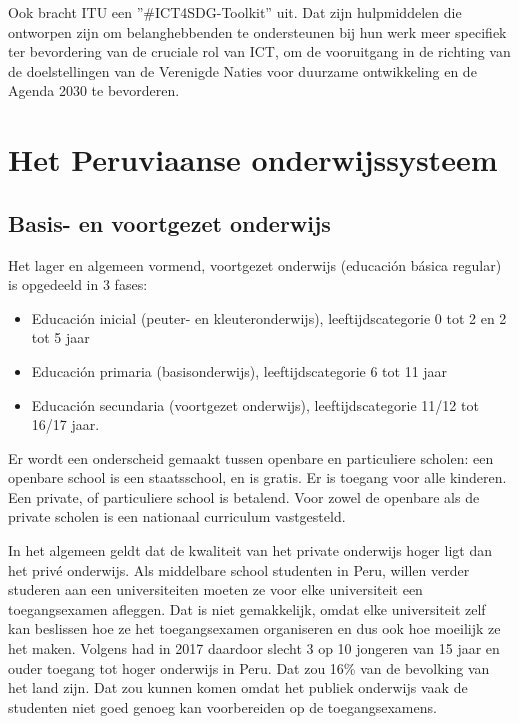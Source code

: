 
Ook bracht ITU een ''\#ICT4SDG-Toolkit'' uit. Dat zijn hulpmiddelen die ontworpen zijn om belanghebbenden te ondersteunen bij hun werk meer specifiek ter bevordering van de cruciale rol van ICT, om de vooruitgang in de richting van de doelstellingen van de Verenigde Naties voor duurzame ontwikkeling en de Agenda 2030 te bevorderen. \autocite{ITU2015}
 
\section{Het Peruviaanse onderwijssysteem}
\subsection{Basis- en voortgezet onderwijs}
Het lager en algemeen vormend, voortgezet onderwijs (educación básica regular) is opgedeeld in 3 fases:
 \begin{itemize}
\item Educación inicial (peuter- en kleuteronderwijs), leeftijdscategorie 0 tot 2 en 2 tot 5 jaar
\item Educación primaria (basisonderwijs), leeftijdscategorie 6 tot 11 jaar
\item Educación secundaria (voortgezet onderwijs), leeftijdscategorie 11/12 tot 16/17 jaar.
\end{itemize}
Er wordt een onderscheid gemaakt tussen openbare en particuliere scholen: een openbare school is een staatsschool, en is gratis. Er is toegang voor alle kinderen. Een private, of particuliere school is betalend. Voor zowel de openbare als de private scholen is een nationaal curriculum vastgesteld.  \autocite{Nuffic2015}

In het algemeen geldt dat de kwaliteit van het private onderwijs hoger ligt dan het privé onderwijs. Als middelbare school studenten in Peru, willen verder studeren aan een universiteiten moeten ze voor elke universiteit een toegangsexamen afleggen. Dat is niet gemakkelijk, omdat elke universiteit zelf kan beslissen hoe ze het toegangsexamen organiseren en dus ook hoe moeilijk ze het maken. Volgens \autocite{Repulbica2017} had in 2017 daardoor slecht 3 op 10 jongeren van 15 jaar en ouder toegang tot hoger onderwijs in Peru. Dat zou 16\% van de bevolking van het land zijn. \autocite{NoSeQueEstudiar2020} Dat zou kunnen komen omdat het publiek onderwijs vaak de studenten niet goed genoeg kan voorbereiden op de toegangsexamens.

